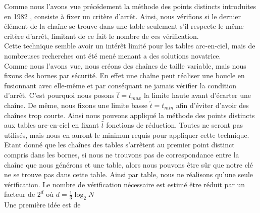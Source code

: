 	Comme nous l'avons vue précédement la méthode des points distincts introduites en 1982 \cite{Rivest}, consiste à fixer un critère d'arrêt. Ainsi, nous vérifions si le dernier élément de la chaîne se trouve dans une table seulement s'il respecte le même critère d'arrêt, limitant de ce fait le nombre de ces vérification.\\

	Cette technique semble avoir un intérêt limité pour les tables arc-en-ciel, mais de nombreuses recherches ont été mené menant a des solutions novatrice.\\

	Comme nous l'avons vue, nous créons des chaînes de taille variable, mais nous fixons des bornes par sécurité. En effet une chaîne peut réaliser une boucle en fusionnant avec elle-même et par conséquant ne jamais vérifier la condition d'arrêt. C'est pourquoi nous posons $\hat{t}=t_{max}$ la limite haute avant d'écarter une chaîne. De même, nous fixons une limite basse $\check{t}=t_{min}$ afin d'éviter d'avoir des chaînes trop courte. Ainsi nous pouvons appliqué la méthode des points distincts aux tables arc-en-ciel en fixant $\hat{t}$ fonctions de réduction. Toutes ne seront pas utilisés, mais nous en auront le minimun requis pour appliquer cette technique.\\

	Etant donné que les chaînes des tables s'arrêtent au premier point distinct compris dans les bornes, si nous ne trouvons pas de correspondance entre la chaîne que nous générons et une table, alors nous pouvons être sûr que notre clé ne se trouve pas dans cette table. Ainsi par table, nous ne réalisons qu'une seule vérification. Le nombre de vérification nécessaire est estimé être réduit par un facteur de $2^d$ où $d=\frac{1}{3}\log_2 N$\\

	Une première idée est de 
	
\endinput{}
